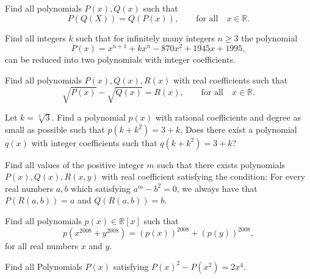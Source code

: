 \begin{question}
Find all polynomials  $ P(x),Q(x)$ such that
\[P(Q(X))=Q(P(x)), \qquad \text{for all} \quad  x \in \mathbb R.\]
\end{question}





\begin{question}
Find all integers $ k$ such that for infinitely many integers $ n \ge 3$ the polynomial
\[ P(x) =x^{n+ 1}+ kx^n - 870x^2 + 1945x + 1995,\]
can be reduced into two polynomials with integer coefficients.
\end{question}





\begin{question}
Find all polynomials $ P(x),Q(x),R(x)$ with real coefficients such that
\[\sqrt{P(x)}-\sqrt{Q(x)}=R(x), \qquad \text{for all} \quad  x \in \mathbb R.\]
\end{question}





\begin{question}
Let $k = \sqrt[3]{3}$. Find a polynomial $p(x)$ with rational coefficients and degree as small as possible such that $p(k+k^{2}) = 3+k$. Does there exist a polynomial $q(x)$ with integer coefficients such that $q(k+k^{2}) = 3+k$?
\end{question}





\begin{question}
Find all values of the positive integer $ m$ such that there exists polynomials $ P(x),Q(x),R(x,y)$ with real coefficient satisfying the condition: For every real numbers $ a,b$ which satisfying $ a^m-b^2=0$, we always have that $ P(R(a,b))=a$ and $ Q(R(a,b))=b$.
\end{question}





\begin{question}
Find all polynomials $ p(x)\in \mathbb{R}[x]$ such that \[p(x^{2008} + y^{2008}) = (p(x))^{2008}+(p(y))^{2008},\] for all real numbers $x$ and $y$.
\end{question}





\begin{question}
Find all Polynomials $P(x)$ satisfying $P(x)^2-P(x^2) =2x^4$.
\end{question}





